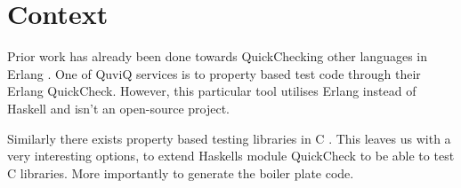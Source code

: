 \section{Context}


Prior work has already been done towards QuickChecking other languages in Erlang \citep{QuickCheckAUTOSAR}.
One of QuviQ services is to property based test code through their Erlang QuickCheck.
However, this particular tool utilises Erlang instead of Haskell and isn't an open-source project. %

Similarly there exists property based testing libraries in C \citep{theft}.
This leaves us with a very interesting options, to extend Haskells module QuickCheck to be able to test C libraries.
More importantly to generate the boiler plate code.
